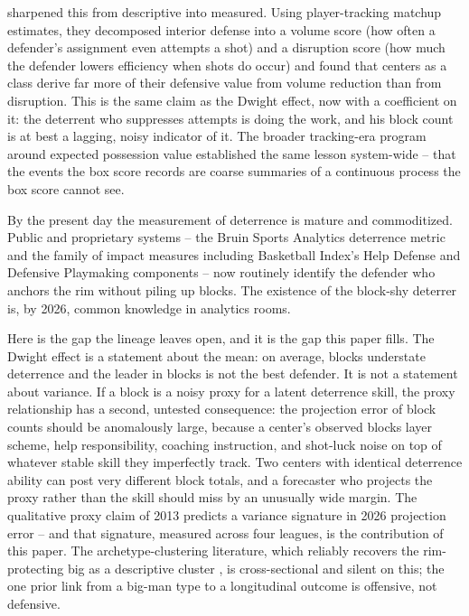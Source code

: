 \documentclass[11pt]{article}
\begin{document}
\citet{franks2015counterpoints} sharpened this from descriptive into measured. Using player-tracking matchup estimates, they decomposed interior defense into a volume score (how often a defender's assignment even attempts a shot) and a disruption score (how much the defender lowers efficiency when shots do occur) and found that centers as a class derive far more of their defensive value from volume reduction than from disruption. This is the same claim as the Dwight effect, now with a coefficient on it: the deterrent who suppresses attempts is doing the work, and his block count is at best a lagging, noisy indicator of it. The broader tracking-era program around expected possession value \citep{cervone2016multiresolution} established the same lesson system-wide -- that the events the box score records are coarse summaries of a continuous process the box score cannot see.

By the present day the measurement of deterrence is mature and commoditized. Public and proprietary systems -- the Bruin Sports Analytics deterrence metric \citep{bruin2021deterrence} and the family of impact measures including Basketball Index's Help Defense and Defensive Playmaking components -- now routinely identify the defender who anchors the rim without piling up blocks. The existence of the block-shy deterrer is, by 2026, common knowledge in analytics rooms.

Here is the gap the lineage leaves open, and it is the gap this paper fills. The Dwight effect is a statement about the mean: on average, blocks understate deterrence and the leader in blocks is not the best defender. It is not a statement about variance. If a block is a noisy proxy for a latent deterrence skill, the proxy relationship has a second, untested consequence: the projection error of block counts should be anomalously large, because a center's observed blocks layer scheme, help responsibility, coaching instruction, and shot-luck noise on top of whatever stable skill they imperfectly track. Two centers with identical deterrence ability can post very different block totals, and a forecaster who projects the proxy rather than the skill should miss by an unusually wide margin. The qualitative proxy claim of 2013 predicts a variance signature in 2026 projection error -- and that signature, measured across four leagues, is the contribution of this paper. The archetype-clustering literature, which reliably recovers the rim-protecting big as a descriptive cluster \citep{cheng2017eighttypes}, is cross-sectional and silent on this; the one prior link from a big-man type to a longitudinal outcome is offensive, not defensive.
\end{document}

